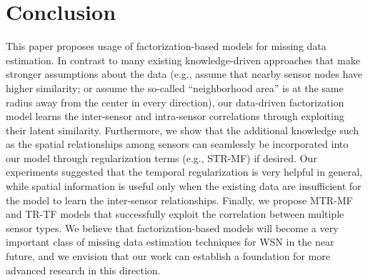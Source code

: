 \section{Conclusion}  \label{sec:conc}
This paper proposes usage of factorization-based models for missing data estimation.
In contrast to many existing knowledge-driven approaches that make stronger assumptions about the data (e.g., assume that nearby sensor nodes have higher similarity; or assume the so-called ``neighborhood area'' is at the same radius away from the center in every direction), our data-driven factorization model learns the inter-sensor and intra-sensor correlations through exploiting their latent similarity.
Furthermore, we show that the additional knowledge such as the spatial relationships among sensors can seamlessly be incorporated into our model through regularization terms (e.g., STR-MF) if desired.
Our experiments suggested that the temporal regularization is very helpful in general, while spatial information is useful only when the existing data are insufficient for the model to learn the inter-sensor relationships.
Finally, we propose MTR-MF and TR-TF models that successfully exploit the correlation between multiple sensor types.
We believe that factorization-based models will become a very important class of missing data estimation techniques for WSN in the near future, and we envision that our work can establish a foundation for more advanced research in this direction.
